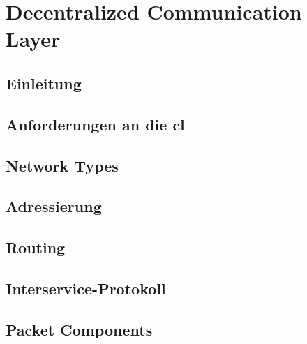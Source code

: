 \chapter{Decentralized Communication Layer}
\renewcommand{\kapitelautor}{Autor: Martin Exner}

\section{Einleitung}


\section{Anforderungen an die \gls*{cl}}


\section{Network Types}


\section{Adressierung}


\section{Routing}


\section{Interservice-Protokoll} %


\section{Packet Components}


